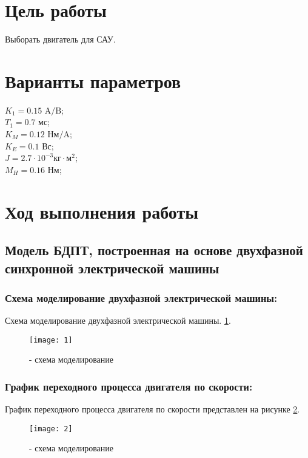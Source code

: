 







\section{Цель работы}
Выборать двигатель для САУ.


\section{Варианты параметров}

\begin{center}
	$K_1=0.15\text{ A/B}$;\\
	$T_1=0.7\text{ мс}$;\\
	$K_M=0.12\text{ Нм/A}$;\\
	$K_E=0.1\text{ Вс}$;\\
	$J=2.7\cdot 10^{-3}\text{кг}\cdot\text{м}^2$;\\
	$M_H=0.16\text{ Нм}$;\\
\end{center}

\section{Ход выполнения работы}
\subsection{Модель БДПТ, построенная на основе двухфазной синхронной электрической машины}
\subsubsection{Схема моделирование двухфазной электрической машины:}
Схема моделирование двухфазной электрической машины. \ref{pic:pic_1}.
\begin{figure}[H]
	\begin{center}
		\texttt{[image: 1]}
		\caption{- схема моделирование} 
		\label{pic:pic_1} %
	\end{center}
\end{figure}

\newpage

\subsubsection{График переходного процесса двигателя по скорости:}
График переходного процесса двигателя по скорости представлен на рисунке \ref{pic:pic_2}.
\begin{figure}[H]
	\begin{center}
		\texttt{[image: 2]}
		\caption{- схема моделирование} 
		\label{pic:pic_2} %
	\end{center}
\end{figure}

